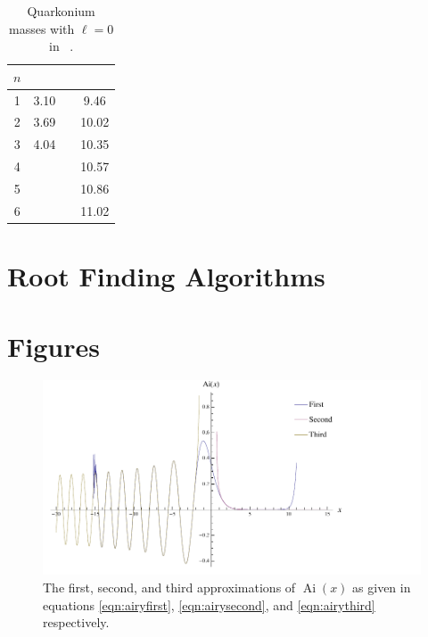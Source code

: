 \documentclass[]{article}
\newcommand{\Ai}[1]{\ensuremath{\operatorname{Ai}({#1})}}
\begin{document}
\begin{table}[H]
	\begin{center}
		\begin{tabular}{ c c c c }
			$n$ & \ccbar & & \bbbar\\
			\hline
			1 & 3.10 & & 9.46 \\
			2 & 3.69 & & 10.02\\
			3 & 4.04 & & 10.35\\
			4 &      & & 10.57\\
			5 &      & & 10.86\\
			6 &      & & 11.02\\
		\end{tabular}
		\caption{Quarkonium masses with $\ell = 0$ in \GeV~\cite{ref:gdaniell}.}
		\label{tab:mesonmasses}
	\end{center}  
\end{table}

\section{Root Finding Algorithms}\label{sec:algorithms}


\section{Figures}\label{sec:figures}

\begin{figure}[H]
	\hspace*{-0.15\textwidth}
	\centering
	\includegraphics[scale=1.3]{approximations}
	\caption{The first, second, and third approximations of \Ai{x} as given in equations \ref{eqn:airyfirst}, \ref{eqn:airysecond}, and \ref{eqn:airythird} respectively.}
	\label{fig:approximations}
\end{figure}
\end{document}
